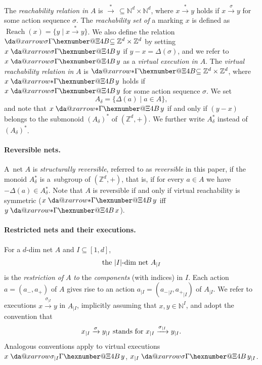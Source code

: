 \documentclass[11pt,a4paper]{amsart}
\makeatletter
\DeclareMathOperator{\Reach}{Reach}
\newcommand{\step}[1]{\mathrel{\xrightarrow{#1}}}
\newcommand{\reach}{\step{*}}
\newcommand{\virtual}[1]{\mathrel{\xdashrightarrow{#1}}\hspace{-0.3em}}
\newcommand{\vreach}{\virtual{*}}
\newcommand{\D}{{}_{\delta}}
\newcommand{\Nat}{\mathbb{N}}
\newcommand{\Zset}{\mathbb{Z}}
\newcommand{\restr}[1]{_{|{#1}}}
\newcommand{\setN}{\Nat}
\newcommand{\setZ}{\Zset}
\newcommand*{\da@rightarrow}{\mathchar"0\hexnumber@\symAMSa 4B }
\newcommand*{\xdashrightarrow}[2][]{%
  \mathrel{%
    \mathpalette{\da@xarrow{#1}{#2}{}\da@rightarrow{\,}{}}{}%
  }%
}
\newcommand*{\da@xarrow}[7]{%
  \sbox0{$\ifx#7\scriptstyle\scriptscriptstyle\else\scriptstyle\fi#5#1#6\m@th$}%
  \sbox2{$\ifx#7\scriptstyle\scriptscriptstyle\else\scriptstyle\fi#5#2#6\m@th$}%
  \sbox4{$#7\dabar@\m@th$}%
  \dimen@=\wd0 %
  \ifdim\wd2 >\dimen@
    \dimen@=\wd2 %
  \fi
  \count@=2 %
  \def\da@bars{\dabar@\dabar@}%
  \@whiledim\count@\wd4<\dimen@\do{%
    \advance\count@\@ne
    \expandafter\def\expandafter\da@bars\expandafter{%
      \da@bars
      \dabar@ 
    }%
  }%
  \mathrel{#3}%
  \mathrel{%
    \mathop{\da@bars}\limits
    \ifx\\#1\\%
    \else
      _{\copy0}%
    \fi
    \ifx\\#2\\%
    \else
      ^{\copy2}%
    \fi
  }%
  \mathrel{#4}%
}
\theoremstyle{plain}
\theoremstyle{definition}
\theoremstyle{defC}
\theoremstyle{thmC}
\makeatother
\begin{document}
The \emph{reachability relation in} $A$ 
is $\reach\,\subseteq\setN^d\times\setN^d$, where
$x\xrightarrow{*}y$ holds if $x\xrightarrow{\sigma}y$ for some
action sequence $\sigma$. The \emph{reachability set of} a marking $x$
is defined as $\Reach(x)=\{y\mid x\reach y\}$.
We also define the relation $\virtual{\sigma}\, \subseteq
\setZ^d\times\setZ^d$ by setting $x\virtual{\sigma}y$ if
$y-x=\Delta(\sigma)$,
and we refer to  $x\virtual{\sigma}y$ as a \emph{virtual execution in $A$}.
The \emph{virtual reachability relation in} $A$ 
is $\vreach\,\subseteq\setZ^d\times\setZ^d$, where
$x\vreach y$ holds if $x\virtual{\sigma}y$ for some
action sequence $\sigma$.
 We set
\[A\D=\{\Delta(a)\mid a\in A\},\]
and note that 
 $x\virtual{*} y$ if and only if $(y-x)$ belongs to the submonoid $(A\D)^*$ of
 $(\setZ^d,+)$.
We further write $A\D^*$ instead of $(A\D)^*$.

\paragraph{Reversible nets.}
A~net $A$ is 
\emph{structurally reversible}, referred to as \emph{reversible} in this
paper, if the monoid $A\D^*$ is a~subgroup of $(\setZ^d,+)$, that is, if for every
$a\in A$ we have $-\Delta(a)\in A\D^*$.
Note that $A$ is reversible if and only if
 virtual reachability is symmetric ($x\virtual{*}y$ iff
$y\virtual{*}x$).

\paragraph{Restricted nets and their executions.}
For a $d$-dim net $A$ and $I\subseteq [1,d]$, 
\begin{equation*}
	\textnormal{the $|I|$-dim net $A\restr{I}$}
\end{equation*}
	is the \emph{restriction of} $A$ \emph{to} the
	\emph{components} (with indices)  in $I$.
	Each action $a=(a_-,a_+)$ of $A$
	gives rise to an action
	$a\restr{I}=({a_-}\restr{I},{a_+}\restr{I})$ of $A\restr{I}$.
We refer to 
executions 
$x\step{\sigma\restr{I}}y$ in $A\restr{I}$,  implicitly assuming 
that $x,y\in\setN^I$, and
adopt the convention that
\begin{equation*}
	\textnormal{$x\restr{I}\step{\sigma}y\restr{I}$ stands for
	$x\restr{I}\step{\sigma\restr{I}}y\restr{I}$.} 
\end{equation*}
Analogous conventions apply to virtual executions
$x\virtual{\sigma\restr{I}}y$, 
$x\restr{I}\virtual{\sigma}y\restr{I}$.
\end{document}
